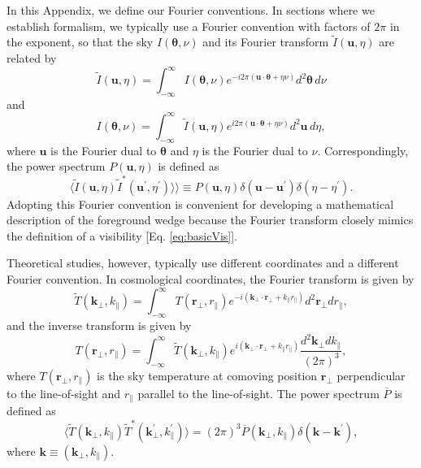 \documentclass[twocolumn,aps,prd,nofootinbib,showpacs]{revtex4-1}
\begin{document}
In this Appendix, we define our Fourier conventions.  In sections where we establish formalism, we typically use a Fourier convention with factors of $2\pi$ in the exponent, so that the sky $I(\boldsymbol \theta, \nu)$ and its Fourier transform $\widetilde{I}(\mathbf{u}, \eta)$ are related by
\begin{equation}
\label{eq:Fourier1a}
\widetilde{I}(\mathbf{u}, \eta) = \int_{-\infty}^\infty I(\boldsymbol \theta, \nu) e^{-i 2 \pi (\mathbf{u} \cdot \boldsymbol \theta + \eta \nu)} d^2\boldsymbol \theta \,d\nu
\end{equation}
and
\begin{equation}
I(\boldsymbol \theta, \nu) = \int_{-\infty}^\infty  \widetilde{I}(\mathbf{u}, \eta) e^{i 2 \pi (\mathbf{u} \cdot \boldsymbol \theta + \eta \nu)} d^2\mathbf{u} \,d\eta,
\end{equation}
where $\mathbf{u}$ is the Fourier dual to $\boldsymbol \theta$ and $\eta$ is the Fourier dual to $\nu$.  Correspondingly, the power spectrum $P(\mathbf{u}, \eta)$ is defined as
\begin{equation}
\langle \widetilde{I}(\mathbf{u}, \eta) \widetilde{I}^*(\mathbf{u}^\prime, \eta^\prime) \rangle \rangle \equiv P(\mathbf{u}, \eta) \delta(\mathbf{u} - \mathbf{u}^\prime) \delta(\eta - \eta^\prime).
\end{equation}
Adopting this Fourier convention is convenient for developing a mathematical description of the foreground wedge because the Fourier transform closely mimics the definition of a visibility [Eq. \eqref{eq:basicVis}].  

Theoretical studies, however, typically use different coordinates and a different Fourier convention.  In cosmological coordinates, the Fourier transform is given by
\begin{equation}
\label{eq:Fourier1b}
\widetilde{T}(\mathbf{k}_\perp, k_\parallel) = \int_{-\infty}^\infty T(\mathbf{r}_\perp, r_\parallel) e^{-i (\mathbf{k}_\perp \cdot \mathbf{r}_\perp + k_\parallel r_\parallel)} d^2 \mathbf{r}_\perp dr_\parallel,
\end{equation}
and the inverse transform is given by
\begin{equation}
T(\mathbf{r}_\perp, r_\parallel) = \int_{-\infty}^\infty \widetilde{T}(\mathbf{k}_\perp, k_\parallel) e^{i (\mathbf{k}_\perp \cdot \mathbf{r}_\perp + k_\parallel r_\parallel)} \frac{d^2 \mathbf{k}_\perp dk_\parallel}{(2\pi)^3},
\end{equation}
where $T(\mathbf{r}_\perp, r_\parallel)$ is the sky temperature at comoving position $\mathbf{r}_\perp$ perpendicular to the line-of-sight and $r_\parallel$ parallel to the line-of-sight.  The power spectrum $\overline{P}$ is defined as 
\begin{equation}
\langle \widetilde{T}(\mathbf{k}_\perp, k_\parallel) \widetilde{T}^*(\mathbf{k}^\prime_\perp, k_\parallel^\prime) \rangle = (2\pi)^3 \overline{P}(\mathbf{k}_\perp, k_\parallel) \delta(\mathbf{k} - \mathbf{k}^\prime),
\end{equation}
where $\mathbf{k} \equiv (\mathbf{k}_\perp, k_\parallel)$.
\end{document}
